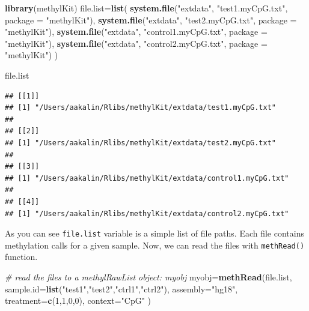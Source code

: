 \documentclass[12pt,]{krantz}
\newenvironment{Shaded}{\begin{snugshade}}{\end{snugshade}}
\newcommand{\CommentTok}[1]{\textcolor[rgb]{0.56,0.35,0.01}{\textit{#1}}}
\newcommand{\DataTypeTok}[1]{\textcolor[rgb]{0.13,0.29,0.53}{#1}}
\newcommand{\DecValTok}[1]{\textcolor[rgb]{0.00,0.00,0.81}{#1}}
\newcommand{\KeywordTok}[1]{\textcolor[rgb]{0.13,0.29,0.53}{\textbf{#1}}}
\newcommand{\NormalTok}[1]{#1}
\newcommand{\StringTok}[1]{\textcolor[rgb]{0.31,0.60,0.02}{#1}}
\begin{document}
\begin{Shaded}
\begin{Highlighting}[]
\KeywordTok{library}\NormalTok{(methylKit)}
\NormalTok{file.list=}\KeywordTok{list}\NormalTok{( }\KeywordTok{system.file}\NormalTok{(}\StringTok{"extdata"}\NormalTok{, }
                            \StringTok{"test1.myCpG.txt"}\NormalTok{, }\DataTypeTok{package =} \StringTok{"methylKit"}\NormalTok{),}
                \KeywordTok{system.file}\NormalTok{(}\StringTok{"extdata"}\NormalTok{,}
                            \StringTok{"test2.myCpG.txt"}\NormalTok{, }\DataTypeTok{package =} \StringTok{"methylKit"}\NormalTok{),}
                \KeywordTok{system.file}\NormalTok{(}\StringTok{"extdata"}\NormalTok{, }
                            \StringTok{"control1.myCpG.txt"}\NormalTok{, }\DataTypeTok{package =} \StringTok{"methylKit"}\NormalTok{),}
                \KeywordTok{system.file}\NormalTok{(}\StringTok{"extdata"}\NormalTok{, }
                            \StringTok{"control2.myCpG.txt"}\NormalTok{, }\DataTypeTok{package =} \StringTok{"methylKit"}\NormalTok{) )}

\NormalTok{file.list}
\end{Highlighting}
\end{Shaded}

\begin{verbatim}
## [[1]]
## [1] "/Users/aakalin/Rlibs/methylKit/extdata/test1.myCpG.txt"
## 
## [[2]]
## [1] "/Users/aakalin/Rlibs/methylKit/extdata/test2.myCpG.txt"
## 
## [[3]]
## [1] "/Users/aakalin/Rlibs/methylKit/extdata/control1.myCpG.txt"
## 
## [[4]]
## [1] "/Users/aakalin/Rlibs/methylKit/extdata/control2.myCpG.txt"
\end{verbatim}

As you can see \texttt{file.list} variable is a simple list of file paths. Each file contains methylation calls for a given sample. Now, we can read the files with \texttt{methRead()} function.

\begin{Shaded}
\begin{Highlighting}[]
\CommentTok{# read the files to a methylRawList object: myobj}
\NormalTok{myobj=}\KeywordTok{methRead}\NormalTok{(file.list,}
           \DataTypeTok{sample.id=}\KeywordTok{list}\NormalTok{(}\StringTok{"test1"}\NormalTok{,}\StringTok{"test2"}\NormalTok{,}\StringTok{"ctrl1"}\NormalTok{,}\StringTok{"ctrl2"}\NormalTok{),}
           \DataTypeTok{assembly=}\StringTok{"hg18"}\NormalTok{,}
           \DataTypeTok{treatment=}\KeywordTok{c}\NormalTok{(}\DecValTok{1}\NormalTok{,}\DecValTok{1}\NormalTok{,}\DecValTok{0}\NormalTok{,}\DecValTok{0}\NormalTok{),}
           \DataTypeTok{context=}\StringTok{"CpG"}
\NormalTok{           )}
\end{Highlighting}
\end{Shaded}
\end{document}
